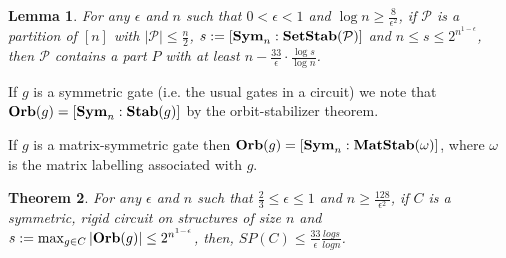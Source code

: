\documentclass[12pt]{report}
\newtheorem{thm}{Theorem} \newtheorem{claim}{Claim}
\newtheorem{lem}[thm]{Lemma} \newtheorem{prop}[thm]{Proposition}
\newcommand{\stab}{\text{\textbf{Stab}}}
\newcommand{\setstab}{\text{\textbf{SetStab}}}
\newcommand{\matstab}{\text{\textbf{MatStab}}}
\newcommand{\sym}{\text{\textbf{Sym}}}
\newcommand{\orb}{\text{\textbf{Orb}}}
\begin{document}
\begin{lem}
  \label{lem:small-means-support}
  For any $\epsilon$ and $n$ such that $0 < \epsilon < 1$ and $\log n \geq
  \frac{8}{\epsilon^2}$, if $\mathcal{P}$ is a partition of $[n]$ with $\vert
  \mathcal{P} \vert \leq \frac{n}{2}$, $s:= [\sym_n : \setstab (\mathcal{P})]$
  and $n \leq s \leq 2^{n^{1-\epsilon}}$, then $\mathcal{P}$ contains a part $P$
  with at least $n - \frac{33}{\epsilon} \cdot \frac{\log s} {\log n}$.
\end{lem}

If $g$ is a symmetric gate (i.e. the usual gates in a circuit) we note that
$\orb(g) = [\sym_n : \stab (g)]$ by the orbit-stabilizer theorem.

If $g$ is a matrix-symmetric gate then $\orb(g) = [\sym_n:\matstab (\omega)]$,
where $\omega$ is the matrix labelling associated with $g$.

\begin{thm}
  For any $\epsilon$ and $n$ such that $\frac{2}{3} \leq \epsilon \leq 1$ and $n
  \geq \frac{128}{\epsilon^2}$, if $C$ is a symmetric, rigid circuit on
  structures of size $n$ and $s := \max_{g \in C} \vert \orb (g)\vert \leq
  2^{n^{1-\epsilon}}$, then, $SP(C) \leq \frac{33}{\epsilon}\frac{log s}{log
    n}$.
\end{thm}
\end{document}
